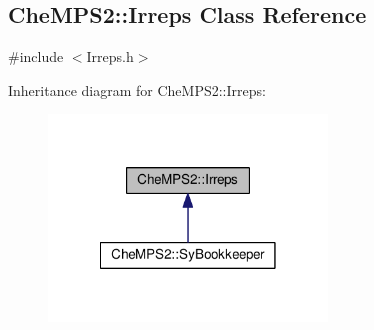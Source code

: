 \hypertarget{classCheMPS2_1_1Irreps}{\subsection{Che\-M\-P\-S2\-:\-:Irreps Class Reference}
\label{classCheMPS2_1_1Irreps}
}


{\ttfamily \#include $<$Irreps.\-h$>$}



Inheritance diagram for Che\-M\-P\-S2\-:\-:Irreps\-:\nopagebreak
\begin{figure}[H]
\begin{center}
\leavevmode
\includegraphics[width=210pt]{classCheMPS2_1_1Irreps__inherit__graph}
\end{center}
\end{figure}
